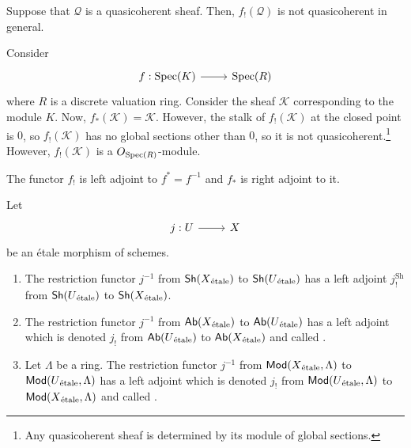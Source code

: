 \documentclass [11 pt, oneside] {article}
\begin{document}
Suppose that $\mathscr{Q}$ is a quasicoherent sheaf. Then, $f_!(\mathscr{Q})$ is not quasicoherent in general.

\begin{example}[ ]\label{}\text{}
Consider 
\[
\begin{tikzcd}
f:\Spec(K)\ar[r]&\Spec(R)
\end{tikzcd}
\]
where $R$ is a discrete valuation ring. Consider the sheaf $\mathscr{K}$ corresponding to the module $K$. Now, $f_*(\mathscr{K}) =\mathscr{K}$. However, the stalk of $f_!(\mathscr{K}) $ at the closed point is $0$, so $f_!(\mathscr{K})$ has no global sections other than $0$, so it is not quasicoherent.\footnote{Any quasicoherent sheaf is determined by its module of global sections.} However, $f_!(\mathscr{K})$ is a $\relax{O}_{\operatorname{Spec} (R)}$-module.
\end{example}

The functor $f_!$ is left adjoint to $f^*=f^{-1}$ and $f_*$ is right adjoint to it.

\begin{definition}\label{}\text{}
Let 
\[
\begin{tikzcd}
j:U\ar[r]&X
\end{tikzcd}
\]
be an \'etale morphism of schemes.
\begin{enumerate}
	\item The restriction functor $j^{-1}$ from $\textsf{Sh}(X\textsubscript{\'etale})$ to $\textsf{Sh}(U\textsubscript{\'etale})$ has a left adjoint $j_!^{\textrm{Sh}}$ from $\textsf{Sh}(U\textsubscript{\'etale})$ to $\textsf{Sh}(X\textsubscript{\'etale})$.
	\item The restriction functor $j^{-1}$ from $\textsf{Ab}(X\textsubscript{\'etale})$ to  $\textsf{Ab}(U\textsubscript{\'etale})$ has a left adjoint which is denoted $j_!$ from $\textsf{Ab}(U\textsubscript{\'etale})$ to $\textsf{Ab}(X\textsubscript{\'etale})$ and called .
	\item Let $\Lambda$ be a ring. The restriction functor $j^{-1}$ from $\textsf{Mod}(X\textsubscript{\'etale}, \Lambda)$ to $\textsf{Mod}(U\textsubscript{\'etale}, \Lambda)$ has a left adjoint which is denoted $j_!$ from $\textsf{Mod}(U\textsubscript{\'etale}, \Lambda)$ to $\textsf{Mod}(X\textsubscript{\'etale}, \Lambda)$ and called .
\end{enumerate}
\end{definition}
\end{document}
